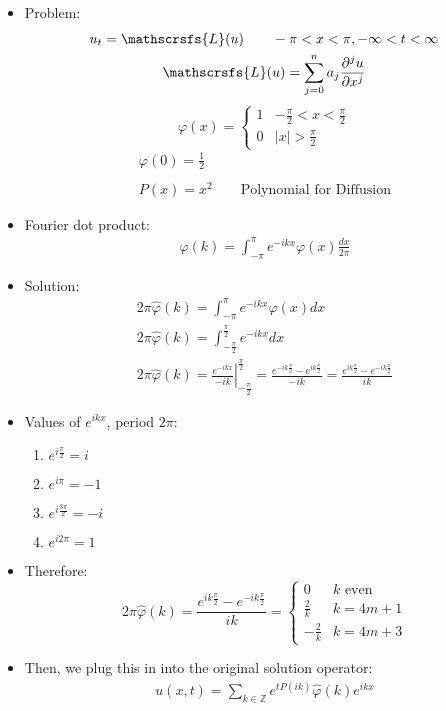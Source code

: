 \documentclass[12pt, a4paper]{article}
\begin{document}
\begin{itemize}
    \item Problem:
    \begin{gather*}
        u_t = \mathscrsfs{L}(u) \qquad -\pi<x<\pi, -\infty<t<\infty\\
    \mathscrsfs{L}(u)= \sum_{j=0}^{n} a_j \frac{\partial^j u}{\partial x^j}\\
    \end{gather*}
    \[ \varphi(x) = \begin{cases} 
        1 & -\frac{\pi}{2}<x< \frac{\pi}{2} \\
        0 & |x| > \frac{\pi}{2}
     \end{cases}\]
    \begin{gather*}
        \varphi(0) = \frac{1}{2}\\\\
        P(x) = x^2 \qquad \text{Polynomial for Diffusion}
    \end{gather*}
    \item Fourier dot product:
    \begin{gather*}
        \hat{\varphi}(k) = \int_{-\pi}^\pi e^{-ikx}\varphi(x) \frac{dx}{2\pi}
    \end{gather*}
    \item Solution:
    \begin{gather*}
        2\pi \hat{\varphi}(k) = \int_{-\pi}^\pi e^{-ikx}\varphi(x) dx\\
        2\pi \hat{\varphi}(k) = \int_{-\frac{\pi}{2}}^{\frac{\pi}{2}} e^{-ikx} dx \\
        2\pi \hat{\varphi}(k) = \left.\frac{e^{-ikx}}{-ik}\right\rvert_{-\frac{\pi}{2}}^{\frac{\pi}{2}} = \frac{e^{-ik\frac{\pi}{2}} - e^{ik\frac{\pi}{2}}}{-ik} = \frac{e^{ik\frac{\pi}{2}} - e^{-ik\frac{\pi}{2}}}{ik}
    \end{gather*}
    \item Values of $e^{ikx}$, period $2\pi$:
    \begin{enumerate}
        \item $e^{i\frac{\pi}{2}} = i$
        \item $e^{i\pi} = -1$
        \item $e^{i\frac{3\pi}{2}} = -i$
        \item $e^{i2\pi} = 1$
    \end{enumerate}
    \item Therefore:
    \[ 2\pi \hat{\varphi}(k)= \frac{e^{ik\frac{\pi}{2}} - e^{-ik\frac{\pi}{2}}}{ik} =  \begin{cases} 
        0 & k \text{ even} \\
        \frac{2}{k} & k = 4m+1\\
        -\frac{2}{k} & k =4m+3
    \end{cases}\]  
    \item Then, we plug this in into the original solution operator:
    \begin{gather*}
        u(x, t) = \sum_{k \in \mathbb{Z}} e^{tP(ik)}\hat{\varphi}(k)e^{ikx}
    \end{gather*}
\end{itemize}
\vspace{0.3em}
\end{document}
